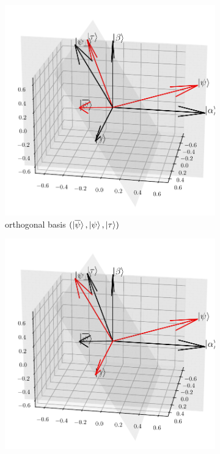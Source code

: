 \documentclass[a4paper,10pt]{book}
\numberwithin{equation}{section}
\begin{document}
\begin{figure}[h]
    \centering
    \begin{subfigure}[b]{0.33\columnwidth}
        \includegraphics[width=\columnwidth]{figures/basic_3.pdf}
        \caption{orthogonal basis $(\ket{\overline{\psi}},\ket{\psi},\ket{\tau})$}
    \end{subfigure}
    \begin{subfigure}[b]{0.33\columnwidth}
        \includegraphics[width=\columnwidth]{figures/basic_2.pdf}

\end{subfigure}
\end{figure}
\end{document}
